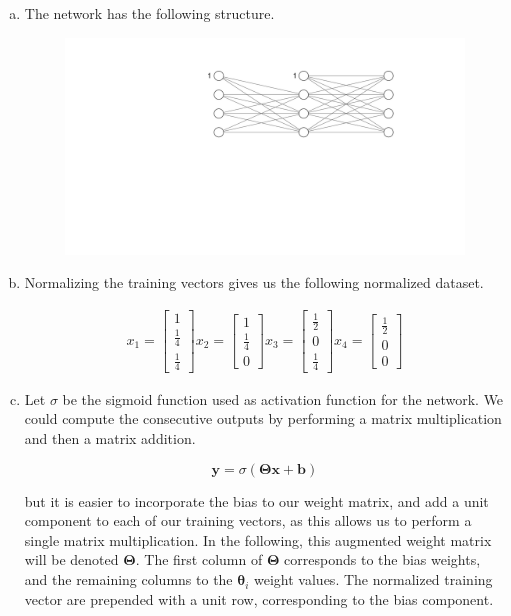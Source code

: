 \documentclass[a4paper, 10pt, twoside]{article}
\begin{document}
\begin{enumerate}[a)]
	\item The network has the following structure.
	      \begin{figure}[h]
		      \includegraphics[width=0.8 \textwidth]{nn.png}
	      \end{figure}

	\item Normalizing the training vectors gives us the following normalized dataset.

	      \begin{align*}
		      x_1 = \begin{bmatrix}1 \\ \frac{1}{4} \\ \frac{1}{4}\end{bmatrix}
		      x_2 = \begin{bmatrix}1 \\ \frac{1}{4} \\ 0\end{bmatrix}
		      x_3 = \begin{bmatrix}\frac{1}{2} \\ 0 \\ \frac{1}{4}\end{bmatrix}
		      x_4 = \begin{bmatrix}\frac{1}{2} \\ 0 \\ 0\end{bmatrix}
	      \end{align*}

	\item
	      Let $\sigma$ be the sigmoid function used as activation function for the network. We could compute the consecutive outputs by performing a matrix multiplication and then a matrix addition.

	      \[
		      \bm{y} = \sigma(\bm{\Theta}\bm{x} + \bm{b})
	      \]

	      but it is easier to incorporate the bias to our weight matrix, and add a unit component to each of our training vectors, as this allows us to perform a single matrix multiplication. In the following, this augmented weight matrix will be denoted $\bm{\Theta}$. The first column of $\bm{\Theta}$ corresponds to the bias weights, and the remaining columns to the $\bm{\theta}_i$ weight values. The normalized training vector are prepended with a unit row, corresponding to the bias component.


\end{enumerate}
\end{document}
